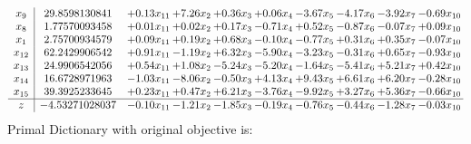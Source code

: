 \documentclass[9pt]{article}
\begin{document}
\[\begin{array}{c| c c@{\hskip 2pt} c@{\hskip 2pt} c@{\hskip 2pt} c@{\hskip 2pt} c@{\hskip 2pt} c@{\hskip 2pt} c@{\hskip 2pt} c@{\hskip 2pt} }
 x_{9}   &  29.8598130841 & +  0.13 x_{11} & +  7.26 x_{2} & +  0.36 x_{3} & +  0.06 x_{4} & -3.67 x_{5} & -4.17 x_{6} & -3.92 x_{7} & -0.69 x_{10}\\
 x_{8}   &  1.77570093458 & +  0.01 x_{11} & +  0.02 x_{2} & +  0.17 x_{3} & -0.71 x_{4} & +  0.52 x_{5} & -0.87 x_{6} & -0.07 x_{7} & +  0.09 x_{10}\\
 x_{1}   &  2.75700934579 & +  0.09 x_{11} & +  0.19 x_{2} & +  0.68 x_{3} & -0.10 x_{4} & -0.77 x_{5} & +  0.31 x_{6} & +  0.35 x_{7} & -0.07 x_{10}\\
 x_{12}   &  62.2429906542 & +  0.91 x_{11} & -1.19 x_{2} & +  6.32 x_{3} & -5.90 x_{4} & -3.23 x_{5} & -0.31 x_{6} & +  0.65 x_{7} & -0.93 x_{10}\\
 x_{13}   &  24.9906542056 & +  0.54 x_{11} & +  1.08 x_{2} & -5.24 x_{3} & -5.20 x_{4} & -1.64 x_{5} & -5.41 x_{6} & +  5.21 x_{7} & +  0.42 x_{10}\\
 x_{14}   &  16.6728971963 & -1.03 x_{11} & -8.06 x_{2} & -0.50 x_{3} & +  4.13 x_{4} & +  9.43 x_{5} & +  6.61 x_{6} & +  6.20 x_{7} & -0.28 x_{10}\\
 x_{15}   &  39.3925233645 & +  0.23 x_{11} & +  0.47 x_{2} & +  6.21 x_{3} & -3.76 x_{4} & -9.92 x_{5} & +  3.27 x_{6} & +  5.36 x_{7} & -0.66 x_{10}\\
\hline
z    &  -4.53271028037 & -0.10 x_{11} & -1.21 x_{2} & -1.85 x_{3} & -0.19 x_{4} & -0.76 x_{5} & -0.44 x_{6} & -1.28 x_{7} & -0.03 x_{10}\\
\end{array}\]
Primal Dictionary with original objective is:
\end{document}
